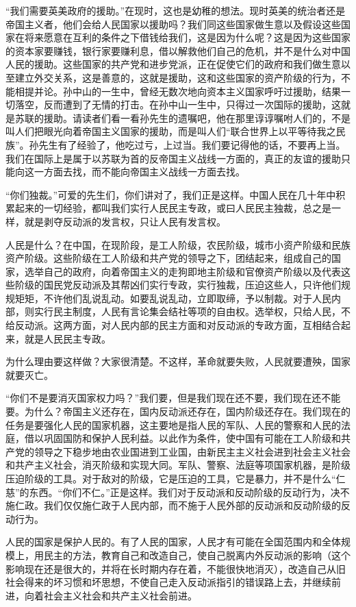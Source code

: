 “我们需要英美政府的援助。”在现时，这也是幼稚的想法。现时英美的统治者还是帝国主义者，他们会给人民国家以援助吗？我们同这些国家做生意以及假设这些国家在将来愿意在互利的条件之下借钱给我们，这是因为什么呢？这是因为这些国家的资本家要赚钱，银行家要赚利息，借以解救他们自己的危机，并不是什么对中国人民的援助。这些国家的共产党和进步党派，正在促使它们的政府和我们做生意以至建立外交关系，这是善意的，这就是援助，这和这些国家的资产阶级的行为，不能相提并论。孙中山的一生中，曾经无数次地向资本主义国家呼吁过援助，结果一切落空，反而遭到了无情的打击。在孙中山一生中，只得过一次国际的援助，这就是苏联的援助。请读者们看一看孙先生的遗嘱吧，他在那里谆谆嘱咐人们的，不是叫人们把眼光向着帝国主义国家的援助，而是叫人们“联合世界上以平等待我之民族”。孙先生有了经验了，他吃过亏，上过当。我们要记得他的话，不要再上当。我们在国际上是属于以苏联为首的反帝国主义战线一方面的，真正的友谊的援助只能向这一方面去找，而不能向帝国主义战线一方面去找。

“你们独裁。”可爱的先生们，你们讲对了，我们正是这样。中国人民在几十年中积累起来的一切经验，都叫我们实行人民民主专政，或曰人民民主独裁，总之是一样，就是剥夺反动派的发言权，只让人民有发言权。

人民是什么？在中国，在现阶段，是工人阶级，农民阶级，城市小资产阶级和民族资产阶级。这些阶级在工人阶级和共产党的领导之下，团结起来，组成自己的国家，选举自己的政府，向着帝国主义的走狗即地主阶级和官僚资产阶级以及代表这些阶级的国民党反动派及其帮凶们实行专政，实行独裁，压迫这些人，只许他们规规矩矩，不许他们乱说乱动。如要乱说乱动，立即取缔，予以制裁。对于人民内部，则实行民主制度，人民有言论集会结社等项的自由权。选举权，只给人民，不给反动派。这两方面，对人民内部的民主方面和对反动派的专政方面，互相结合起来，就是人民民主专政。

为什么理由要这样做？大家很清楚。不这样，革命就要失败，人民就要遭殃，国家就要灭亡。

“你们不是要消灭国家权力吗？”我们要，但是我们现在还不要，我们现在还不能要。为什么？帝国主义还存在，国内反动派还存在，国内阶级还存在。我们现在的任务是要强化人民的国家机器，这主要地是指人民的军队、人民的警察和人民的法庭，借以巩固国防和保护人民利益。以此作为条件，使中国有可能在工人阶级和共产党的领导之下稳步地由农业国进到工业国，由新民主主义社会进到社会主义社会和共产主义社会，消灭阶级和实现大同。军队、警察、法庭等项国家机器，是阶级压迫阶级的工具。对于敌对的阶级，它是压迫的工具，它是暴力，并不是什么“仁慈”的东西。“你们不仁。”正是这样。我们对于反动派和反动阶级的反动行为，决不施仁政。我们仅仅施仁政于人民内部，而不施于人民外部的反动派和反动阶级的反动行为。

人民的国家是保护人民的。有了人民的国家，人民才有可能在全国范围内和全体规模上，用民主的方法，教育自己和改造自己，使自己脱离内外反动派的影响（这个影响现在还是很大的，并将在长时期内存在着，不能很快地消灭），改造自己从旧社会得来的坏习惯和坏思想，不使自己走入反动派指引的错误路上去，并继续前进，向着社会主义社会和共产主义社会前进。

